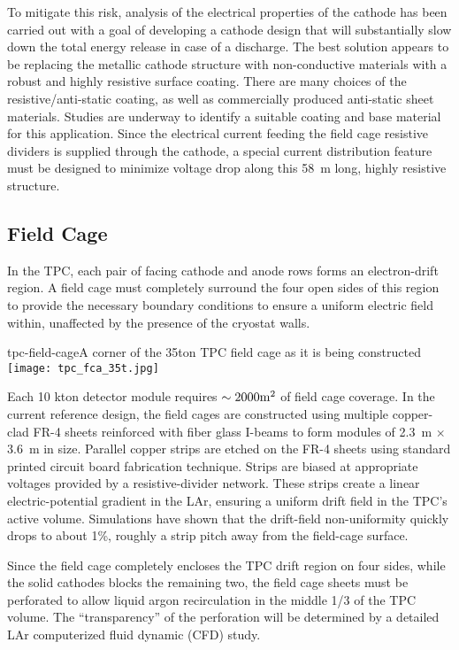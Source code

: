 To mitigate this risk, analysis of the electrical properties of the
cathode has been carried out with a goal of developing a cathode
design that will substantially slow down the total energy release in
case of a discharge.  The best solution appears to be replacing the
metallic cathode structure with non-conductive materials with a robust
and highly resistive surface coating.  There are many choices of the
resistive/anti-static coating, as well as commercially produced
anti-static sheet materials.  Studies are underway to identify a
suitable coating and base material for this application.  Since the
electrical current feeding the field cage resistive dividers is
supplied through the cathode, a special current distribution feature
must be designed to minimize voltage drop along this 58~m long, highly
resistive structure.


\subsection{Field Cage}
\label{subsec:fd-ref-fieldcage}

In the TPC, each pair of facing cathode and anode rows forms an
electron-drift region. A field cage must completely surround the four
open sides of this region to provide the necessary boundary conditions
to ensure a uniform electric field within, unaffected by the presence
of the cryostat walls.


\begin{cdrfigure}{tpc-field-cage}{A corner of the 35ton TPC field cage as it is being constructed}
\texttt{[image: tpc\_fca\_35t.jpg]}
\end{cdrfigure}


Each 10 kton detector module requires $\sim 2000 \rm{m}^2$ of field
cage coverage. In the current reference design, the field cages are
constructed using multiple copper-clad FR-4 sheets reinforced with
fiber glass I-beams to form modules of 2.3~m $\times$ 3.6~m in
size. Parallel copper strips are etched on the FR-4 sheets using
standard printed circuit board fabrication technique. Strips are
biased at appropriate voltages provided by a resistive-divider
network. These strips create a linear electric-potential gradient in
the LAr, ensuring a uniform drift field in the TPC's active volume.
Simulations have shown that the drift-field non-uniformity quickly
drops to about 1\%, roughly a strip pitch away from the field-cage
surface.

Since the field cage completely encloses the TPC drift region on four
sides, while the solid cathodes blocks the remaining two, the field
cage sheets must be perforated to allow liquid argon recirculation in
the middle 1/3 of the TPC volume. The ``transparency'' of the
perforation will be determined by a detailed LAr computerized fluid
dynamic (CFD) study.

